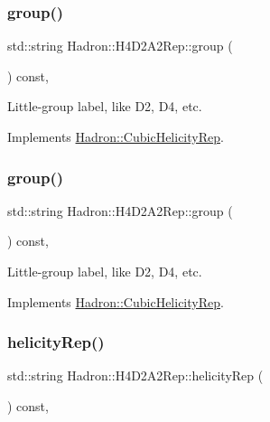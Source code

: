 \subsubsection{\texorpdfstring{group()}{group()}\hspace{0.1cm}{\footnotesize\ttfamily [2/3]}}
{\footnotesize\ttfamily std\+::string Hadron\+::\+H4\+D2\+A2\+Rep\+::group (\begin{DoxyParamCaption}{ }\end{DoxyParamCaption}) const\hspace{0.3cm}{\ttfamily [inline]}, {\ttfamily [virtual]}}

Little-\/group label, like D2, D4, etc. 

Implements \mbox{\hyperlink{structHadron_1_1CubicHelicityRep_a101a7d76cd8ccdad0f272db44b766113}{Hadron\+::\+Cubic\+Helicity\+Rep}}.

\mbox{\label{structHadron_1_1H4D2A2Rep_aa2ecad1777dd00c1a36199688495a9ac}} 
\subsubsection{\texorpdfstring{group()}{group()}\hspace{0.1cm}{\footnotesize\ttfamily [3/3]}}
{\footnotesize\ttfamily std\+::string Hadron\+::\+H4\+D2\+A2\+Rep\+::group (\begin{DoxyParamCaption}{ }\end{DoxyParamCaption}) const\hspace{0.3cm}{\ttfamily [inline]}, {\ttfamily [virtual]}}

Little-\/group label, like D2, D4, etc. 

Implements \mbox{\hyperlink{structHadron_1_1CubicHelicityRep_a101a7d76cd8ccdad0f272db44b766113}{Hadron\+::\+Cubic\+Helicity\+Rep}}.

\mbox{\label{structHadron_1_1H4D2A2Rep_acefae4ce29aeb8f45ae4976209500037}} 
\subsubsection{\texorpdfstring{helicityRep()}{helicityRep()}\hspace{0.1cm}{\footnotesize\ttfamily [1/2]}}
{\footnotesize\ttfamily std\+::string Hadron\+::\+H4\+D2\+A2\+Rep\+::helicity\+Rep (\begin{DoxyParamCaption}{ }\end{DoxyParamCaption}) const\hspace{0.3cm}{\ttfamily [inline]}, {\ttfamily [virtual]}}

